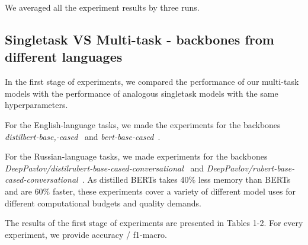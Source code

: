 We averaged all the experiment results by three runs. %

\subsection{Singletask VS Multi-task - backbones from different languages}

In the first stage of experiments, we compared the performance of our multi-task models with the performance of analogous singletask models with the same hyperparameters. 

For the English-language tasks, we made the experiments for the backbones \textit{distilbert-base,-cased}~\cite{distilbert} and \textit{bert-base-cased}~\cite{bert}. %

For the Russian-language tasks, we made experiments for the backbones \textit{DeepPavlov/distilrubert-base-cased-conversational}~\cite{distilrubert} and \textit{DeepPavlov/rubert-base-cased-conversational}~\cite{rubert}. As distilled BERTs takes 40\% less memory than BERTs and are 60\% faster, these experiments cover a variety of different model uses for different computational budgets and quality demands. 

The results of the first stage of experiments are presented in Tables 1-2. For every experiment, we provide accuracy / f1-macro. 

